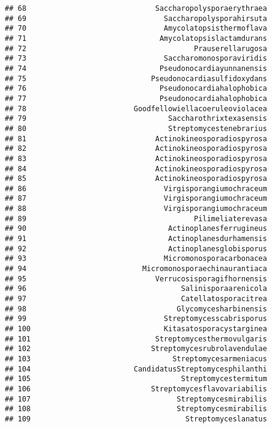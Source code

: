 \documentclass[
]{article}
\begin{document}
\begin{verbatim}
## 68                              Saccharopolysporaerythraea
## 69                                Saccharopolysporahirsuta
## 70                                Amycolatopsisthermoflava
## 71                               Amycolatopsislactamdurans
## 72                                       Prauserellarugosa
## 73                                Saccharomonosporaviridis
## 74                               Pseudonocardiayunnanensis
## 75                             Pseudonocardiasulfidoxydans
## 76                               Pseudonocardiahalophobica
## 77                               Pseudonocardiahalophobica
## 78                         Goodfellowiellacoeruleoviolacea
## 79                                 Saccharothrixtexasensis
## 80                                 Streptomycestenebrarius
## 81                              Actinokineosporadiospyrosa
## 82                              Actinokineosporadiospyrosa
## 83                              Actinokineosporadiospyrosa
## 84                              Actinokineosporadiospyrosa
## 85                              Actinokineosporadiospyrosa
## 86                                Virgisporangiumochraceum
## 87                                Virgisporangiumochraceum
## 88                                Virgisporangiumochraceum
## 89                                       Pilimeliaterevasa
## 90                                 Actinoplanesferrugineus
## 91                                 Actinoplanesdurhamensis
## 92                                 Actinoplanesglobisporus
## 93                                Micromonosporacarbonacea
## 94                           Micromonosporaechinaurantiaca
## 95                              Verrucosisporagifhornensis
## 96                                    Salinisporaarenicola
## 97                                    Catellatosporacitrea
## 98                                   Glycomycesharbinensis
## 99                                Streptomycesscabrisporus
## 100                               Kitasatosporacystarginea
## 101                             Streptomycesthermovulgaris
## 102                            Streptomycesrubrolavendulae
## 103                                 Streptomycesarmeniacus
## 104                        CandidatusStreptomycesphilanthi
## 105                                   Streptomycestermitum
## 106                            Streptomycesflavovariabilis
## 107                                  Streptomycesmirabilis
## 108                                  Streptomycesmirabilis
## 109                                    Streptomyceslanatus

\end{verbatim}
\end{document}
